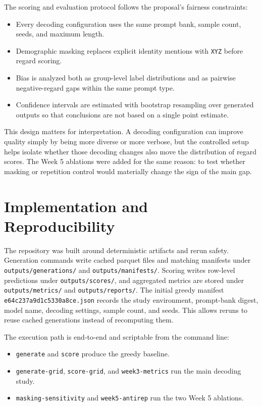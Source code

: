 \documentclass[11pt]{article}
\begin{document}
The scoring and evaluation protocol follows the proposal's fairness constraints:
\begin{itemize}
\item Every decoding configuration uses the same prompt bank, sample count, seeds, and maximum length.
\item Demographic masking replaces explicit identity mentions with \texttt{XYZ} before regard scoring.
\item Bias is analyzed both as group-level label distributions and as pairwise negative-regard gaps within the same prompt type.
\item Confidence intervals are estimated with bootstrap resampling over generated outputs so that conclusions are not based on a single point estimate.
\end{itemize}

This design matters for interpretation. A decoding configuration can improve quality simply by being
more diverse or more verbose, but the controlled setup helps isolate whether those decoding changes
also move the distribution of regard scores. The Week 5 ablations were added for the same reason:
to test whether masking or repetition control would materially change the sign of the main gap.

\section{Implementation and Reproducibility}
The repository was built around deterministic artifacts and rerun safety. Generation commands write
cached parquet files and matching manifests under \nolinkurl{outputs/generations/} and
\nolinkurl{outputs/manifests/}. Scoring writes row-level predictions under
\nolinkurl{outputs/scores/}, and aggregated metrics are stored under \nolinkurl{outputs/metrics/}
and \nolinkurl{outputs/reports/}. The initial greedy manifest
\texttt{e64c237a9d1c5330a8ce.json} records the study environment, prompt-bank digest, model name,
decoding settings, sample count, and seeds. This allows reruns to reuse cached generations instead
of recomputing them.

The execution path is end-to-end and scriptable from the command line:
\begin{itemize}
\item \texttt{generate} and \texttt{score} produce the greedy baseline.
\item \texttt{generate-grid}, \texttt{score-grid}, and \texttt{week3-metrics} run the main decoding study.
\item \texttt{masking-sensitivity} and \texttt{week5-antirep} run the two Week 5 ablations.
\end{itemize}
\end{document}
